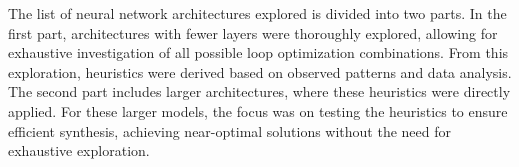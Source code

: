 The list of neural network architectures explored is divided into two parts. In the first part, architectures with fewer layers were thoroughly explored, allowing for exhaustive investigation of all possible loop optimization combinations. From this exploration, heuristics were derived based on observed patterns and data analysis. The second part includes larger architectures, where these heuristics were directly applied. For these larger models, the focus was on testing the heuristics to ensure efficient synthesis, achieving near-optimal solutions without the need for exhaustive exploration.
\\
\begin{table}[H]
\caption{Architectures from which heuristic is derived}
\label{tab:architectures1}
\centering
{}
\end{table}

